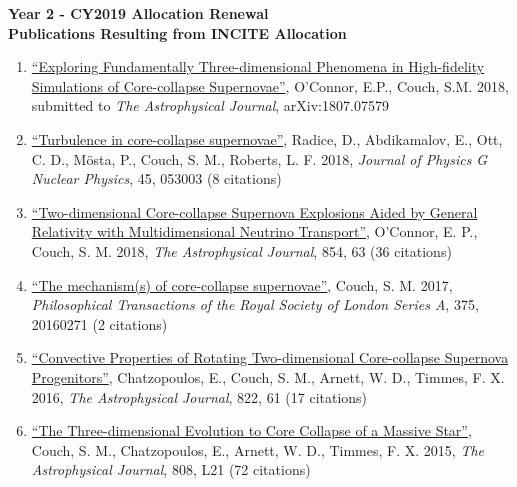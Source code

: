 \documentclass[12pt]{article}
\begin{document}
\begin{center}
{\bf Year 2 - CY2019 Allocation Renewal\\
  Publications Resulting from INCITE Allocation } \vspace{-0.1in}
\end{center}

\begin{enumerate}

  \item \href{http://adsabs.harvard.edu/abs/2018arXiv180707579O}{``Exploring Fundamentally Three-dimensional Phenomena in High-fidelity Simulations of Core-collapse Supernovae''}, O'Connor, E.P., Couch, S.M. 2018, submitted to {\itshape The Astrophysical Journal}, arXiv:1807.07579

  \item \href{https://ui.adsabs.harvard.edu/#abs/2018JPhG...45e3003R/abstract}{``Turbulence in core-collapse supernovae''}, Radice, D., Abdikamalov, E., Ott, C. D., Mösta, P., Couch, S. M., Roberts, L. F. 2018, {\itshape Journal of Physics G Nuclear Physics}, 45, 053003 (8 citations)

  \item \href{https://ui.adsabs.harvard.edu/#abs/2018ApJ...854...63O/abstract}{``Two-dimensional Core-collapse Supernova Explosions Aided by General Relativity with Multidimensional Neutrino Transport''}, O'Connor, E. P., Couch, S. M. 2018, {\itshape The Astrophysical Journal}, 854, 63 (36 citations)

  \item \href{https://ui.adsabs.harvard.edu/#abs/2017RSPTA.37560271C/abstract}{``The mechanism(s) of core-collapse supernovae''}, Couch, S. M. 2017, {\itshape Philosophical Transactions of the Royal Society of London Series A}, 375, 20160271 (2 citations)

  \item \href{https://ui.adsabs.harvard.edu/#abs/2016ApJ...822...61C/abstract}{``Convective Properties of Rotating Two-dimensional Core-collapse Supernova Progenitors''}, Chatzopoulos, E., Couch, S. M., Arnett, W. D., Timmes, F. X. 2016, {\itshape The Astrophysical Journal}, 822, 61 (17 citations)

  \item \href{https://ui.adsabs.harvard.edu/#abs/2015ApJ...808L..21C/abstract}{``The Three-dimensional Evolution to Core Collapse of a Massive Star''}, Couch, S. M., Chatzopoulos, E., Arnett, W. D., Timmes, F. X. 2015, {\itshape The Astrophysical Journal}, 808, L21 (72 citations)
  

\end{enumerate}
\end{document}
